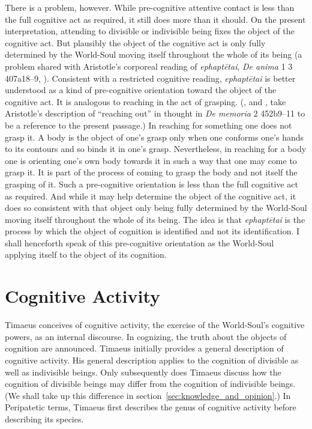 There is a problem, however. While pre-cognitive attentive contact is less than the full cognitive act as required, it still does more than it should. On the present interpretation, attending to divisible or indivisible being fixes the object of the cognitive act. But plausibly the object of the cognitive act is only fully determined by the World-Soul moving itself throughout the whole of its being (a problem shared with Aristotle's corporeal reading of \emph{ephaptētai}, \emph{De anima} 1 3 407a18--9, \citealt[84, 98--9 n26]{Lee:1976xs}). Consistent with a restricted cognitive reading, \emph{ephaptētai} is better understood as a kind of pre-cognitive orientation toward the object of the cognitive act. It is analogous to reaching in the act of grasping. (\citealt[276]{Ross:1906fk}, and \citealt[404 n335]{Cherniss:1944aa}, take Aristotle's description of ``reaching out'' in thought in \emph{De memoria} 2 452b9--11 to be a reference to the present passage.) In reaching for something one does not grasp it. A body is the object of one's grasp only when one conforms one's hands to its contours and so binds it in one's grasp. Nevertheless, in reaching for a body one is orienting one's own body towards it in such a way that one may come to grasp it. It is part of the process of coming to grasp the body and not itself the grasping of it. Such a pre-cognitive orientation is less than the full cognitive act as required. And while it may help determine the object of the cognitive act, it does so consistent with that object only being fully determined by the World-Soul moving itself throughout the whole of its being. The idea is that \emph{ephaptētai} is the process by which the object of cognition is identified and not its identification. I shall henceforth speak of this pre-cognitive orientation as the World-Soul applying itself to the object of its cognition.



\section{Cognitive Activity} %
\label{sec:cognition}

Timaeus conceives of cognitive activity, the exercise of the World-Soul's cognitive powers, as an internal discourse. In cognizing, the truth about the objects of cognition are announced. Timaeus initially provides a general description of cognitive activity. His general description applies to the cognition of divisible as well as indivisible beings. Only subsequently does Timaeus discuss how the cognition of divisible beings may differ from the cognition of indivisible beings. (We shall take up this difference in section~\ref{sec:knowledge_and_opinion}.) In Peripatetic terms, Timaeus first describes the genus of cognitive activity before describing its species.

